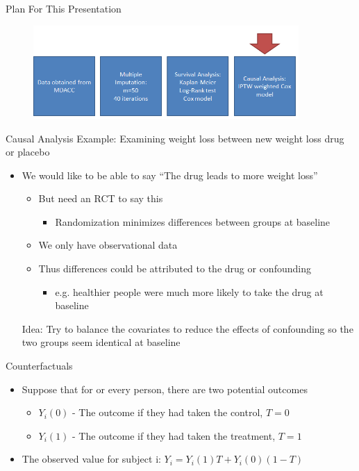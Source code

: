 \begin{frame}{Plan For This Presentation}
  \begin{figure}[h!]
  \centering
    \includegraphics[width=0.9\textwidth]{ps_flow}
\label{fig:ps_flow}
\end{figure} 
\end{frame}

\begin{frame}{Causal Analysis}
Example: Examining weight loss between new weight loss drug or placebo
 \begin{itemize}
  \item We would like to be able to say ``The drug leads to more weight loss''
  \begin{itemize}
   \item But need an RCT to say this
   \begin{itemize}
    \item Randomization minimizes differences between groups at baseline
   \end{itemize}

   \item We only have observational data
   \item Thus differences could be attributed to the drug or confounding
   
   \begin{itemize}
    \item e.g. healthier people were much more likely to take the drug at baseline
   \end{itemize}

  \end{itemize}
Idea: Try to balance the covariates to reduce the effects of confounding
so the two groups seem identical at baseline
 \end{itemize}
\end{frame}


\begin{frame}{Counterfactuals}
\begin{itemize}
 \item Suppose that for or every person, there are two potential outcomes
 \begin{itemize}
  \item $Y_i(0)$ - The outcome if they had taken the control, $T=0$
  \item $Y_i(1)$ - The outcome if they had taken the treatment, $T=1$
 \end{itemize}
 \item The observed value for subject i: $Y_i=Y_i(1)T+Y_i(0)(1-T)$
  \end{itemize}
\end{frame}




